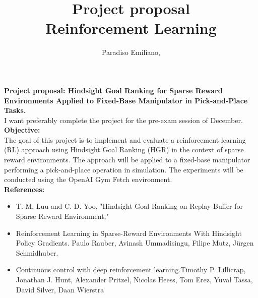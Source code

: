 \documentclass{article}
\author{Paradiso Emiliano,  \quad 1940454}
\title{\Huge Project proposal\\ \centering \Large \textbf{Reinforcement Learning}}
\begin{document}
\maketitle
\noindent
\textbf{Project proposal: Hindsight Goal Ranking for Sparse Reward Environments Applied to Fixed-Base Manipulator in Pick-and-Place Tasks.}\newline\\
 I want preferably complete the project for the pre-exam session of December.
\newline\\
\textbf{Objective:}\newline\\
The goal of this project is to implement and evaluate a reinforcement learning (RL) approach using Hindsight Goal Ranking (HGR) in the context of sparse reward environments. The approach will be applied to a fixed-base manipulator performing a pick-and-place operation in simulation. The experiments will be conducted using the OpenAI Gym Fetch environment.
\newline\\
\textbf{References:} 
\begin{itemize}
\item T. M. Luu and C. D. Yoo, "Hindsight Goal Ranking on Replay Buffer for Sparse Reward Environment,"
\item Reinforcement Learning in Sparse-Reward Environments With Hindsight Policy Gradients. Paulo Rauber, Avinash Ummadisingu, Filipe Mutz, Jürgen Schmidhuber.

\item Continuous control with deep reinforcement learning.Timothy P. Lillicrap, Jonathan J. Hunt, Alexander Pritzel, Nicolas Heess, Tom Erez, Yuval Tassa, David Silver, Daan Wierstra
\end{itemize}
\end{document}

